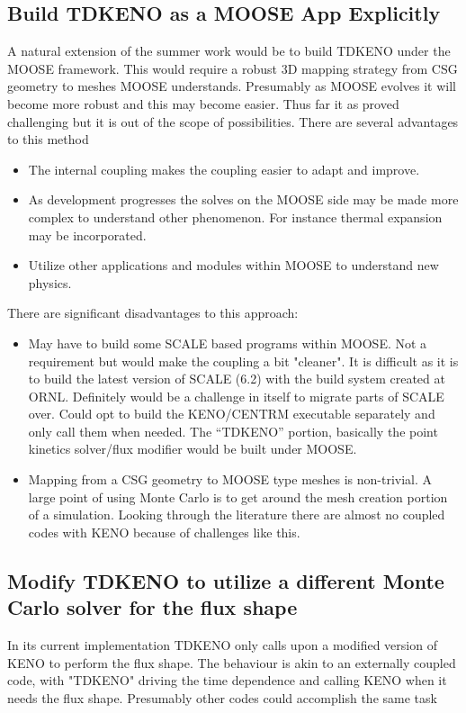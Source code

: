 \documentclass[11pt]{article}
\begin{document}
\subsection{Build TDKENO as a MOOSE App Explicitly}  
A natural extension of the summer work would be to build TDKENO under the MOOSE framework.  This would require a robust 3D mapping strategy from CSG geometry to meshes MOOSE understands.  Presumably as MOOSE evolves it will become more robust and this may become easier.  Thus far it as proved challenging but it is out of the scope of possibilities.   
There are several advantages to this method
\begin{itemize}
    \item The internal coupling makes the coupling easier to adapt and improve. 
    \item As development progresses the solves on the MOOSE side may be made more complex to understand other phenomenon. For instance thermal expansion may be incorporated.  
    \item Utilize other applications and modules within MOOSE to understand new physics. 
\end{itemize}
There are significant disadvantages to this approach:

\begin{itemize}
    \item May have to build some SCALE based programs within MOOSE. Not a requirement but would make the coupling a bit "cleaner".  It is difficult as it is to build the latest version of SCALE (6.2) with the build system created at ORNL. Definitely would be a challenge in itself to migrate parts of SCALE over.
    Could opt to build the KENO/CENTRM executable separately and only call them when needed.  The “TDKENO” portion, basically the point kinetics solver/flux modifier would be built under MOOSE.
    \item Mapping from a CSG geometry to MOOSE type meshes is non-trivial.  A large point of using Monte Carlo is to get around the mesh creation portion of a simulation. Looking through the literature there are almost no coupled codes with KENO because of challenges like this.   
\end{itemize}

\subsection{Modify TDKENO to utilize a different Monte Carlo solver for the flux shape}
	In its current implementation TDKENO only calls upon a modified version of KENO to perform the flux shape.  The behaviour is akin to an externally coupled code, with "TDKENO" driving the time dependence and calling KENO when it needs the flux shape. Presumably other codes could accomplish the same task
	
\end{document}
